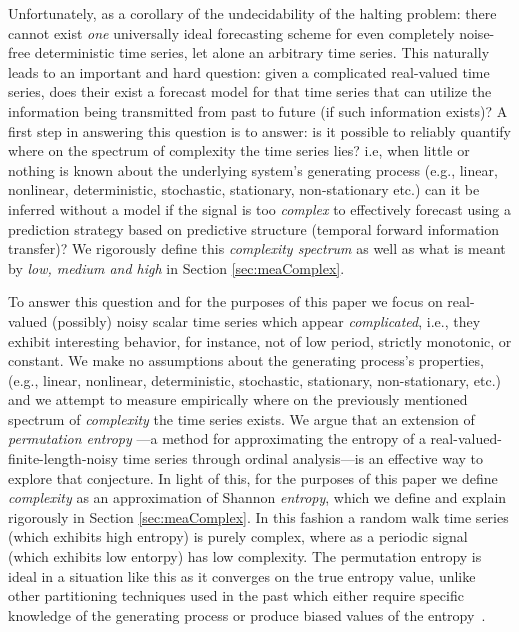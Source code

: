 Unfortunately, as a corollary of the undecidability of the halting problem: there cannot exist \emph{one} universally ideal forecasting scheme for even completely noise-free deterministic time series\cite{weigend-book}, let alone an arbitrary time series. This naturally leads to an important and hard question: given a complicated real-valued time series, does their exist a forecast model for that time series that can utilize the information being transmitted from past to future (if such information exists)? A first step in answering this question is to answer: is it possible to reliably quantify where on the spectrum of complexity the time series lies? i.e, when little or nothing is known about the underlying system's generating process (e.g., linear, nonlinear, deterministic, stochastic, stationary, non-stationary etc.) can it be inferred without a model if the signal is too \emph{complex} to effectively forecast using a prediction strategy based on predictive structure (temporal forward information transfer)? We rigorously define this \emph{complexity spectrum} as well as what is meant by \emph{low, medium and high} in Section \ref{sec:meaComplex}.


To answer this question and for the purposes of this paper we focus on real-valued (possibly) noisy scalar time series which appear \emph{complicated}, i.e., they exhibit interesting behavior, for instance, not of low period, strictly monotonic, or constant. We make no assumptions about the generating process's properties,(e.g., linear, nonlinear, deterministic, stochastic, stationary, non-stationary, etc.) and we attempt to measure empirically where on the previously mentioned spectrum of \emph{complexity} the time series exists.
We argue that an extension of \emph{permutation entropy}
\cite{bandt2002per}---a method for approximating the entropy of a real-valued-finite-length-noisy time series through ordinal analysis---is an effective way to explore that conjecture. In light of this, for the purposes of this paper we define \emph{complexity} as an approximation of Shannon \emph{entropy}, which we define and explain rigorously in Section \ref{sec:meaComplex}. In this fashion a random walk time series (which exhibits high entropy) is purely complex, where as a periodic signal (which exhibits low entorpy) has low complexity. The permutation entropy is ideal in a situation like this as it converges on the true entropy value, unlike other partitioning techniques used in the past which either require specific knowledge of the generating process or produce biased values of the entropy~\cite{bollt2001}.


